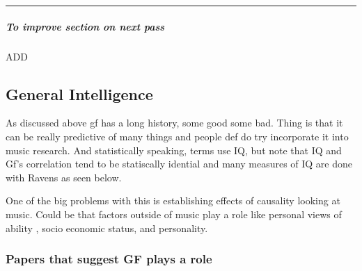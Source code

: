 \documentclass[]{book}
\let\oldsubparagraph\subparagraph
\renewcommand{\subparagraph}[1]{\oldsubparagraph{#1}\mbox{}}
\theoremstyle{definition}
\theoremstyle{definition}
\theoremstyle{definition}
\theoremstyle{remark}
\begin{document}
\begin{center}\rule{0.5\linewidth}{\linethickness}\end{center}

\hypertarget{to-improve-section-on-next-pass}{%
\subparagraph{To improve section on next
pass}\label{to-improve-section-on-next-pass}}

ADD \citep{hansenWorkingMemoryMusical2013}

\hypertarget{general-intelligence}{%
\subsection{General Intelligence}\label{general-intelligence}}

As discussed above gf has a long history, some good some bad. Thing is
that it can be really predictive of many things and people def do try
incorporate it into music research. And statistically speaking, terms
use IQ, but note that IQ and Gf's correlation tend to be statiscally
idential \citep{kovacsProcessOverlapTheory2016} and many measures of IQ
are done with Ravens as seen below.

One of the big problems with this is establishing effects of causality
looking at music. Could be that factors outside of music play a role
like personal views of ability
\citep{mullensiefenInvestigatingImportanceSelftheories2015} , socio
economic status, and personality.

\hypertarget{papers-that-suggest-gf-plays-a-role}{%
\subsubsection{Papers that suggest GF plays a
role}\label{papers-that-suggest-gf-plays-a-role}}
\end{document}
